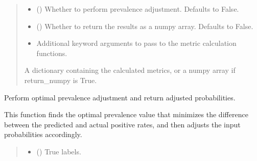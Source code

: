 \documentclass[letterpaper,10pt,english]{sphinxmanual}
\begin{document}
\begin{fulllineitems}
\begin{fulllineitems}
\begin{quote}
\begin{description}
\begin{itemize}
\item {} 
\sphinxAtStartPar
{} (\sphinxstyleliteralemphasis{\sphinxupquote{, }}) \textendash{} Whether to perform prevalence adjustment. Defaults to False.

\item {} 
\sphinxAtStartPar
{} (\sphinxstyleliteralemphasis{\sphinxupquote{, }}) \textendash{} Whether to return the results as a numpy array. Defaults to False.

\item {} 
\sphinxAtStartPar
{} \textendash{} Additional keyword arguments to pass to the metric calculation functions.

\end{itemize}

\sphinxAtStartPar
{} \textendash{} A dictionary containing the calculated metrics, or a numpy array if return\_numpy is True.

\end{description}\end{quote}

\end{fulllineitems}


\begin{fulllineitems}
\label{\detokenize{calzone:calzone.metrics.CalibrationMetrics.optimal_prevalence_adjustment}}
\pysigstartsignatures
{}
\pysigstopsignatures
\sphinxAtStartPar
Perform optimal prevalence adjustment and return adjusted probabilities.

\sphinxAtStartPar
This function finds the optimal prevalence value that minimizes the difference
between the predicted and actual positive rates, and then adjusts the input
probabilities accordingly.
\begin{quote}\begin{description}
\begin{itemize}
\item {} 
\sphinxAtStartPar
{} () \textendash{} True labels.


\end{itemize}
\end{description}
\end{quote}
\end{fulllineitems}
\end{fulllineitems}
\end{document}
